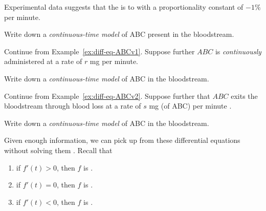 \documentclass[../main.tex]{subfiles}
\begin{document}
\begin{example} \label{ex:diff-eq-ABCv1}
  Experimental data suggests that the  is  to  with a proportionality constant of \(-1\%\) per minute.

  Write down a \emph{continuous-time model} of ABC present in the bloodstream.

  \blanks*
\end{example}
\clearpage

\begin{example} \label{ex:diff-eq-ABCv2}
  Continue from Example~\ref{ex:diff-eq-ABCv1}.  Suppose further \(ABC\) is \emph{continuously} administered at a rate of \(r\) mg per minute. 

  Write down a \emph{continuous-time model} of ABC in the bloodstream.

\end{example}

\begin{exercise} \label{ex:diff-eq-ABCv3}
  Continue from Example~\ref{ex:diff-eq-ABCv2}.  Suppose further that \(ABC\) exits the bloodstream through blood loss at a rate of \(s\) mg (of ABC) per minute .

  Write down a \emph{continuous-time model} of ABC in the bloodstream.

  \blanks*
\end{exercise}
\clearpage

Given enough information, we can pick up  from these differential equations without solving them .  Recall that
\begin{enumerate}[itemsep={2ex}]
  \item if \(f'(t) > 0\), then \(f\) is \underline{\hspace{3in}}.
  \item if \(f'(t) = 0\), then \(f\) is \underline{\hspace{3in}}.
  \item if \(f'(t) < 0\), then \(f\) is \underline{\hspace{3in}}.
\end{enumerate}
\end{document}

